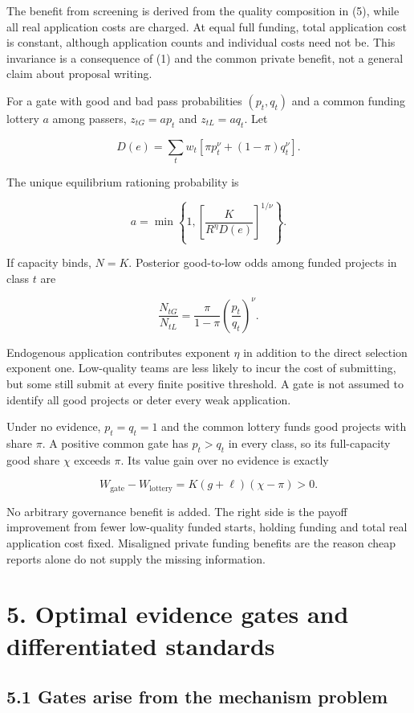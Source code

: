 \documentclass[
  11pt,
]{article}
\begin{document}
The benefit from screening is derived from the quality composition in
(5), while all real application costs are charged. At equal full
funding, total application cost is constant, although application counts
and individual costs need not be. This invariance is a consequence of
(1) and the common private benefit, not a general claim about proposal
writing.

For a gate with good and bad pass probabilities \((p_t,q_t)\) and a
common funding lottery \(a\) among passers, \(z_{tG}=ap_t\) and
\(z_{tL}=aq_t\). Let

\[D(e)=\sum_t w_t[\pi p_t^{\nu}+(1-\pi)q_t^{\nu}].\]

The unique equilibrium rationing probability is

\[a=\min\left\{1,\left[\frac{K}{R^{\eta}D(e)}\right]^{1/\nu}\right\}. \tag{7}\]

If capacity binds, \(N=K\). Posterior good-to-low odds among funded
projects in class \(t\) are

\[\frac{N_{tG}}{N_{tL}}=\frac{\pi}{1-\pi}
\left(\frac{p_t}{q_t}\right)^{\nu}. \tag{8}\]

Endogenous application contributes exponent \(\eta\) in addition to the
direct selection exponent one. Low-quality teams are less likely to
incur the cost of submitting, but some still submit at every finite
positive threshold. A gate is not assumed to identify all good projects
or deter every weak application.

Under no evidence, \(p_t=q_t=1\) and the common lottery funds good
projects with share \(\pi\). A positive common gate has \(p_t>q_t\) in
every class, so its full-capacity good share \(\chi\) exceeds \(\pi\).
Its value gain over no evidence is exactly

\[W_{\mathrm{gate}}-W_{\mathrm{lottery}}
=K(g+\ell)(\chi-\pi)>0. \tag{9}\]

No arbitrary governance benefit is added. The right side is the payoff
improvement from fewer low-quality funded starts, holding funding and
total real application cost fixed. Misaligned private funding benefits
are the reason cheap reports alone do not supply the missing
information.

\section{5. Optimal evidence gates and differentiated
standards}\label{optimal-evidence-gates-and-differentiated-standards}

\subsection{5.1 Gates arise from the mechanism
problem}\label{gates-arise-from-the-mechanism-problem}
\end{document}
